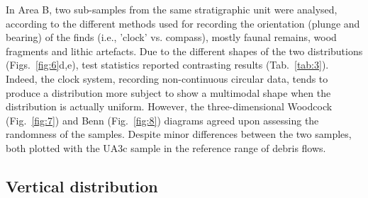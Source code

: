 \documentclass[preprint,authoryear,times]{elsarticle} %
\begin{document}
In Area B, two sub-samples from the same stratigraphic unit were analysed, according to the different methods used for recording the orientation (plunge and bearing) of the finds (i.e., 'clock' vs. compass), mostly faunal remains, wood fragments and lithic artefacts. Due to the different shapes of the two distributions (Figs.~\ref{fig:6}d,e), test statistics reported contrasting results (Tab.~\ref{tab:3}). Indeed, the clock system, recording non-continuous circular data, tends to produce a distribution more subject to show a multimodal shape when the distribution is actually uniform. However, the three-dimensional Woodcock (Fig.~\ref{fig:7}) and Benn (Fig.~\ref{fig:8}) diagrams agreed upon assessing the randomness of the samples. Despite minor differences between the two samples, both plotted with the UA3c sample in the reference range of debris flows.


\subsection{Vertical distribution}


\end{document}
